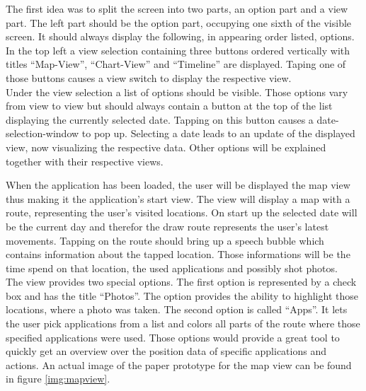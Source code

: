 The first idea was to split the screen into two parts, an option part and a view part. The left part should be the option part, occupying one sixth of the visible screen. It should always display the following, in appearing order listed, options.\\
In the top left a view selection containing three buttons  ordered vertically with titles ``Map-View'', ``Chart-View'' and ``Timeline'' are displayed. Taping one of those buttons causes a view switch to display the respective view.\\
Under the view selection a list of options should be visible. Those options vary from view to view but should always contain a button at the top of the list displaying the currently selected date. Tapping on this button causes a date-selection-window to pop up. Selecting a date leads to an update of the displayed view, now visualizing the respective data.
Other options will be explained together with their respective views.

When  the application has been loaded, the user will be displayed the map view thus making it the application's start view. The view will display a map with a route, representing the user's visited locations. On start up the selected date will be the current day and therefor the draw route represents the user's latest movements. Tapping on the route should bring up a speech bubble which contains information about the tapped location. Those informations will be the time spend on that location, the used applications and possibly shot photos.\\
The  view provides two special options. The first option is represented by a check box and has the title ``Photos''. The option provides the ability to highlight those locations, where a photo was taken. The second option is called ``Apps''. It lets the user pick applications from a list and colors all parts of the route where those specified applications were used. Those options would provide a great tool to quickly get an overview over the position data of specific applications and actions. An actual image of the paper prototype for the map view can be found in figure \ref{img:mapview}.


